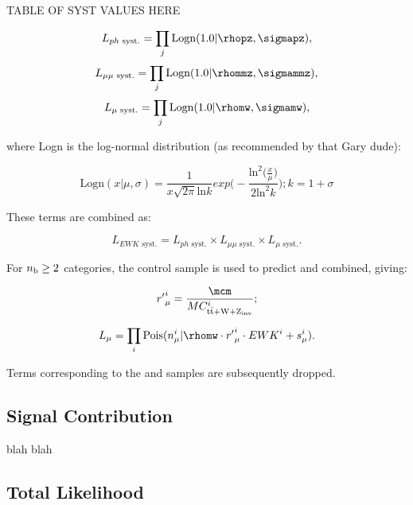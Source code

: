 TABLE OF SYST VALUES HERE

\begin{equation}
L_{ph\text{ syst.}} = \prod_j \text{Logn}(1.0 | \rhopz, \sigmapz),
\end{equation}
\begin{equation}
L_{\mu\mu\text{ syst.}} = \prod_j \text{Logn}(1.0 | \rhommz, \sigmammz),
\end{equation}
\begin{equation}
L_{\mu\text{ syst.}} = \prod_j \text{Logn}(1.0 | \rhomw, \sigmamw),
\end{equation}

where Logn is the log-normal distribution (as recommended by that Gary dude):

\begin{equation}
\text{Logn}(x|\mu, \sigma) = \frac{1}{x\sqrt{2\pi}\text{ln}k} exp \Bigg(-\frac{\text{ln}^2 \big(\frac{x}{\mu}\big)}{2\text{ln}^2k}\Bigg); k = 1+\sigma
\end{equation}

These terms are combined as:

\begin{equation}
L_{EWK\text{ syst.}} = L_{ph\text{ syst.}} \times L_{\mu\mu\text{ syst.}} \times L_{\mu\text{ syst.}}.
\end{equation}

For $n_{\text{b}} \geq 2$ categories, the \mj control sample is used to predict \zinv and
\ttw combined, giving:

\begin{equation}
{r'}^i_{\mu} = \frac{\mcm}{MC^i_{\ttbar + W + Z_{\text{inv}}}};
\end{equation}

\begin{equation}
L_{\mu} = \prod_i \text{Pois}(n_{\mu}^i | \rhomw \cdot {r'}_{\mu}^i \cdot {EWK}^i + s_{\mu}^i).
\end{equation}

Terms corresponding to the \mmj and \gj samples are subsequently dropped.

\subsection{Signal Contribution}
blah blah

\subsection{Total Likelihood}




